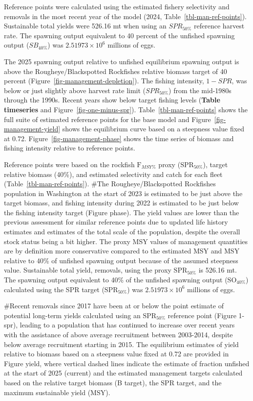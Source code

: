 \documentclass[
]{scrartcl}
\begin{document}
Reference points were calculated using the estimated fishery selectivity
and removals in the most recent year of the model (2024,
Table~\ref{tbl-man-ref-points}). Sustainable total yields were 526.16 mt
when using an \(SPR_{50\%}\) reference harvest rate. The spawning output
equivalent to 40 percent of the unfished spawning output (\(SB_{40\%}\))
was \ensuremath{2.51973\times 10^{6}} millions of eggs.

The 2025 spawning output relative to unfished equilibrium spawning
output is above the Rougheye/Blackspotted Rockfishes relative biomass
target of 40 percent (Figure~\ref{fig-management-depletion}). The
fishing intensity, \(1-SPR\), was below or just slightly above harvest
rate limit (\(SPR_{50\%}\)) from the mid-1980s through the 1990s. Recent
years show below target fishing levels (\textbf{Table timeseries} and
Figure~\ref{fig-one-minus-spr}). Table~\ref{tbl-man-ref-points} shows
the full suite of estimated reference points for the base model and
Figure~\ref{fig-management-yield} shows the equilibrium curve based on a
steepness value fixed at 0.72. Figure~\ref{fig-management-phase} shows
the time series of biomass and fishing intensity relative to reference
points.

Reference points were based on the rockfish \(\text{F}_{MSY\%}\) proxy
(\(\text{SPR}_{50\%}\)), target relative biomass (40\%), and estimated
selectivity and catch for each fleet (Table~\ref{tbl-man-ref-points}).
\#The Rougheye/Blackspotted Rockfishes population in Washington at the
start of 2023 is estimated to be just above the target biomass, and
fishing intensity during 2022 is estimated to be just below the fishing
intensity target (Figure phase). The yield values are lower than the
previous assessment for similar reference points due to updated life
history estimates and estimates of the total scale of the population,
despite the overall stock status being a bit higher. The proxy MSY
values of management quantities are by definition more conservative
compared to the estimated MSY and MSY relative to 40\% of unfished
spawning output because of the assumed steepness value. Sustainable
total yield, removals, using the proxy \(\text{SPR}_{50\%}\) is 526.16
mt. The spawning output equivalent to 40\% of the unfished spawning
output (\(\text{SO}_{40\%}\)) calculated using the SPR target
(\(\text{SPR}_{50\%}\)) was \ensuremath{2.51973\times 10^{6}} millions
of eggs.

\#Recent removals since 2017 have been at or below the point estimate of
potential long-term yields calculated using an \(\text{SPR}_{50\%}\)
reference point (Figure 1-spr), leading to a population that has
continued to increase over recent years with the assistance of above
average recruitment between 2003-2014, despite below average recruitment
starting in 2015. The equilibrium estimates of yield relative to biomass
based on a steepness value fixed at 0.72 are provided in Figure yield,
where vertical dashed lines indicate the estimate of fraction unfished
at the start of 2025 (current) and the estimated management targets
calculated based on the relative target biomass (B target), the SPR
target, and the maximum sustainable yield (MSY).
\end{document}
